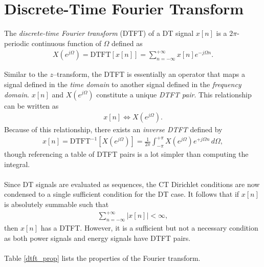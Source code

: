 \documentclass{report}
\begin{document}
\section{Discrete-Time Fourier Transform}
\begin{tcolorbox}[width=\textwidth,colback={white}, sharp corners]
    The \emph{discrete-time Fourier transform} (DTFT) of a DT signal $x[n]$ is a $2\pi$-periodic continuous function of $\Omega$ defined as 
    \begin{align}
        X(e^{j\Omega}) = \text{DTFT}[x[n]] = \sum_{n=-\infty}^{+\infty} x[n] e^{-j\Omega n}.
    \end{align}
\end{tcolorbox}
Similar to the $z$--transform, the DTFT is essentially an operator that maps a signal defined in the \emph{time domain} to another signal defined 
in the \emph{frequency domain}. $x[n]$ and $X(e^{j\Omega})$ constitute a unique \emph{DTFT pair}. This relationship can be written as 
\begin{align}
    x[n] \iff X(e^{j\Omega}).
\end{align}
Because of this relationship, there exists an \emph{inverse DTFT} defined by
\begin{align}
    x[n] = \text{DTFT}^{-1}[X(e^{j\Omega})] = \frac{1}{2\pi}\int_{-\pi}^{+\pi} X(e^{j\Omega}) e^{+j\Omega n} \,d\Omega,
\end{align}
though referencing a table of DTFT pairs is a lot simpler than computing the integral. 
\\ \\
Since DT signals are evaluated as sequences, the CT Dirichlet conditions are now condensed to a single sufficient condition for the DT case. 
It follows that if $x[n]$ is absolutely summable such that 
\begin{align}
    \sum_{n=-\infty}^{+\infty}|x[n]| < \infty,
\end{align}
then $x[n]$ has a DTFT. However, it is a sufficient but not a necessary condition as both power signals and energy signals have DTFT pairs. 
\\ \\
Table \ref{dtft_prop} lists the properties of the Fourier transform.
\end{document}

